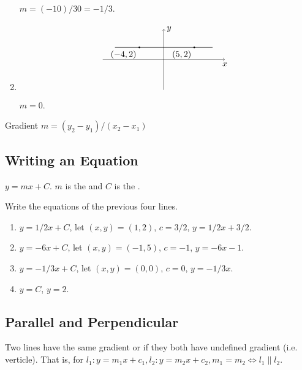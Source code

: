 \documentclass[8pt]{article}
\begin{document}
\begin{enumerate}[label = \probword{(\arabic*)}]
					\solution \(m = (-10)/30 = -1/3\).

					\item 
					\[
						\begin{tikzpicture}[scale = 0.25]
							\draw [black, ->] (-10, 0) -- (10, 0) node [below] {\(x\)};
							\draw [black, ->] (0, -5) -- (0, 5) node [right] {\(y\)};
							\draw [black, domain = -8 : 8] plot (\x, 2);
							\draw [black, fill = black] (-4, 2) circle (3pt) node [anchor = north east] {\((-4, 2)\)};
							\draw [black, fill = black] (5, 2) circle (3pt) node [anchor = north east] {\((5, 2)\)};
						\end{tikzpicture}
					\]

					\solution \(m = 0\).

				\end{enumerate}

			\meth {} Gradient \(m = (y_2 - y_1)/(x_2 - x_1)\)

		\subsection{Writing an Equation}
			\defi {} \(y = mx + C\). \(m\) is the  and \(C\) is the .

			\prob Write the equations of the previous four lines.

			\solution

			\begin{enumerate}[label = \methword{(\arabic*)}]
				\item \(y = 1/2 x + C\), let \((x, y) = (1, 2)\), \(c = 3/2\), \(y = 1/2 x + 3/2\).
				\item \(y = -6 x + C\), let \((x, y) = (-1, 5)\), \(c = -1\), \(y = -6x - 1\).
				\item \(y = -1/3 x + C\), let \((x, y) = (0, 0)\), \(c = 0\), \(y = -1/3 x\).
				\item \(y = C\), \(y = 2\).
			\end{enumerate}

		\subsection{Parallel and Perpendicular}
			\meth {} Two  lines have the same gradient or if they both have undefined gradient (i.e. verticle). That is, for \(l_1: y = m_1 x + c_1, l_2: y = m_2 x + c_2, m_1 = m_2 \Leftrightarrow l_1 \parallel l_2\).
\end{document}
